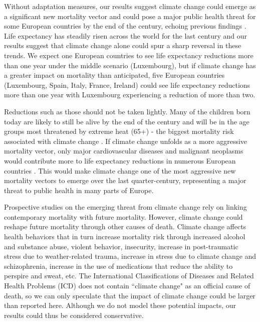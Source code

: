 \documentclass[12pt,]{article}
\begin{document}
Without adaptation measures, our results suggest climate change could
emerge as a significant new mortality vector and could pose a major
public health threat for some European countries by the end of the
century, echoing previous findings
\citep{forzieri2017increasing, patz2005impact}. Life expectancy has
steadily risen across the world for the last century
\citep{oeppen2002broken} and our results suggest that climate change
alone could spur a sharp reversal in these trends. We expect one
European countries to see life expectancy reductions more than one year
under the middle scenario (Luxembourg), but if climate change has a
greater impact on mortality than anticipated, five European countries
(Luxembourg, Spain, Italy, France, Ireland) could see life expectancy
reductions more than one year with Luxembourg experiencing a reduction
of more than two.

Reductions such as those should not be taken lightly. Many of the
children born today are likely to still be alive by the end of the
century and will be in the age groups most threatened by extreme heat
(65+) - the biggest mortality risk associated with climate change
\citep{keatinge2000heat}. If climate change unfolds as a more aggressive
mortality vector, only major cardiovascular diseases and malignant
neoplasms would contribute more to life expectancy reductions in
numerous European countries \citep{arias2013united}. This would make
climate change one of the most aggressive new mortality vectors to
emerge over the last quarter-century, representing a major threat to
public health in many parts of Europe.

Prospective studies on the emerging threat from climate change rely on
linking contemporary mortality with future mortality. However, climate
change could reshape future mortality through other causes of death.
Climate change affects health behaviors that in turn increase mortality
risk through increased alcohol and substance abuse, violent behavior,
insecurity, increase in post-traumatic stress due to weather-related
trauma, increase in stress due to climate change and schizophrenia,
increase in the use of medications that reduce the ability to perspire
and sweat, etc. \citep{patz2005impact} The International Classifications
of Diseases and Related Health Problems (ICD) does not contain ``climate
change" as an official cause of death, so we can only speculate that the
impact of climate change could be larger than reported here. Although we
do not model these potential impacts, our results could thus be
considered conservative.
\end{document}

